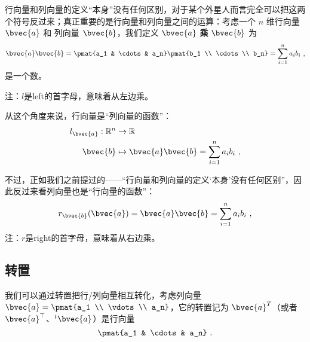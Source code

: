 行向量和列向量的定义“本身”没有任何区别，对于某个外星人而言完全可以把这两个符号反过来；真正重要的是行向量和列向量之间的运算：考虑一个 $n$ 维行向量 $\bvec{a}$ 和 列向量 $\bvec{b}$，我们定义 $\bvec{a}$ \textbf{乘} $\bvec{b}$ 为
\begin{equation}
\bvec{a} \bvec{b} = \pmat{a_1 & \cdots & a_n} \pmat{b_1 \\ \cdots \\ b_n} = \sum_{i = 1}^n a_i b_i~,
\end{equation}
是一个数。

注：$l$是left的首字母，意味着从左边乘。


从这个角度来说，行向量是“列向量的函数”：
\begin{equation}
\begin{aligned}
l_{\bvec{a}}: \mathbb{R}^n &\to \mathbb{R} \\
\bvec{b} &\mapsto \bvec{a} \bvec{b} = \sum_{i = 1}^n a_i b_i~,
\end{aligned}
\end{equation}


不过，正如我们之前提过的——“行向量和列向量的定义‘本身’没有任何区别”，因此反过来看列向量也是“行向量的函数”：
\begin{equation}
r_{\bvec{b}}(\bvec{a}) = \bvec{a} \bvec{b} = \sum_{i = 1}^n a_i b_i~,
\end{equation}
注：$r$是right的首字母，意味着从右边乘。

\subsection{转置}

我们可以通过转置把行/列向量相互转化，考虑列向量 $\bvec{a} = \pmat{a_1 \\ \vdots \\ a_n}$，它的转置记为 $\bvec{a}^T$（或者$\bvec{a}^\top$、${}^t \bvec{a}$）是行向量
\begin{equation}
\pmat{a_1 & \cdots & a_n}~.
\end{equation}


